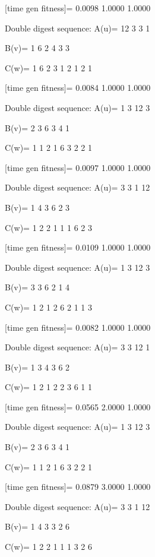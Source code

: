 [time gen fitness]=
    0.0098    1.0000    1.0000

Double digest sequence:
A(u)=
    12     3     3     1

B(v)=
     1     6     2     4     3     3

C(w)=
     1     6     2     3     1     2     1     2     1

[time gen fitness]=
    0.0084    1.0000    1.0000

Double digest sequence:
A(u)=
     1     3    12     3

B(v)=
     2     3     6     3     4     1

C(w)=
     1     1     2     1     6     3     2     2     1

[time gen fitness]=
    0.0097    1.0000    1.0000

Double digest sequence:
A(u)=
     3     3     1    12

B(v)=
     1     4     3     6     2     3

C(w)=
     1     2     2     1     1     1     6     2     3

[time gen fitness]=
    0.0109    1.0000    1.0000

Double digest sequence:
A(u)=
     1     3    12     3

B(v)=
     3     3     6     2     1     4

C(w)=
     1     2     1     2     6     2     1     1     3

[time gen fitness]=
    0.0082    1.0000    1.0000

Double digest sequence:
A(u)=
     3     3    12     1

B(v)=
     1     3     4     3     6     2

C(w)=
     1     2     1     2     2     3     6     1     1

[time gen fitness]=
    0.0565    2.0000    1.0000

Double digest sequence:
A(u)=
     1     3    12     3

B(v)=
     2     3     6     3     4     1

C(w)=
     1     1     2     1     6     3     2     2     1

[time gen fitness]=
    0.0879    3.0000    1.0000

Double digest sequence:
A(u)=
     3     3     1    12

B(v)=
     1     4     3     3     2     6

C(w)=
     1     2     2     1     1     1     3     2     6

